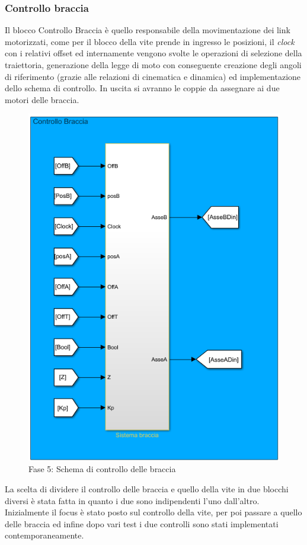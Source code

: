 \subsubsection*{Controllo braccia}
Il blocco Controllo Braccia è quello responsabile della movimentazione dei link motorizzati, come per il blocco della vite prende in ingresso le posizioni, il \textit{clock} con i relativi offset ed internamente vengono svolte le operazioni di selezione della traiettoria, generazione della legge di moto con conseguente creazione degli angoli di riferimento (grazie alle relazioni di cinematica e dinamica) ed implementazione dello schema di controllo. In uscita si avranno le coppie da assegnare ai due motori delle braccia.
\begin{figure}[ht]
	\begin{center}
		\includegraphics[scale=0.75]{Immagini/Sperimentale/ControlloBraccia}
		\caption{Fase 5: Schema di controllo delle braccia}
		\label{fig:controlloBraccia}
	\end{center}
\end{figure}
La scelta di dividere il controllo delle braccia e quello della vite in due blocchi diversi è stata fatta in quanto i due sono indipendenti l'uno dall'altro. Inizialmente il focus è stato posto sul controllo della vite, per poi passare a quello delle braccia ed infine dopo vari test i due controlli sono stati implementati contemporaneamente.
